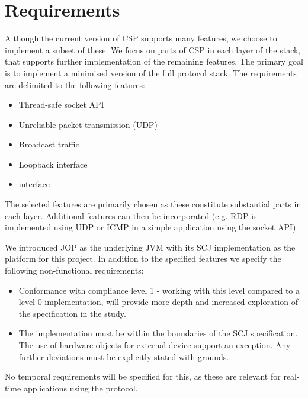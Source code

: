 \section{Requirements}
Although the current version of CSP supports many features, we choose to implement a subset of these. We focus on parts of CSP in each layer of the stack, that supports further implementation of the remaining features. The primary goal is to implement a minimised version of the full protocol stack. The requirements are delimited to the following features:

\begin{itemize}
	\item Thread-safe socket API
	\item Unreliable packet transmission (UDP)
	\item Broadcast traffic
	\item Loopback interface
	\item \iic interface
\end{itemize}

The selected features are primarily chosen as these constitute substantial parts in each layer. Additional features can then be incorporated (e.g. RDP is implemented using UDP or ICMP in a simple application using the socket API). 

We introduced JOP as the underlying JVM with its SCJ implementation as the platform for this project. In addition to the specified features we specify the following non-functional requirements:

\begin{itemize}
	\item Conformance with compliance level 1 - working with this level compared to a level 0 implementation, will provide more depth and increased exploration of the specification in the study.
	\item The implementation must be within the boundaries of the SCJ specification. The use of hardware objects for external device support an exception. Any further deviations must be explicitly stated with grounds.
\end{itemize}

No temporal requirements will be specified for this, as these are relevant for real-time applications using the protocol.